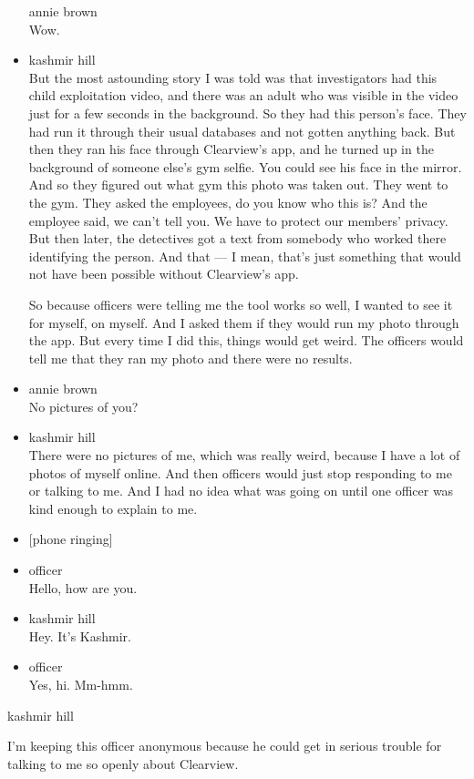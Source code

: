\begin{itemize}
  annie brown\\
  Wow.
\item
  kashmir hill\\
  But the most astounding story I was told was that investigators had
  this child exploitation video, and there was an adult who was visible
  in the video just for a few seconds in the background. So they had
  this person's face. They had run it through their usual databases and
  not gotten anything back. But then they ran his face through
  Clearview's app, and he turned up in the background of someone else's
  gym selfie. You could see his face in the mirror. And so they figured
  out what gym this photo was taken out. They went to the gym. They
  asked the employees, do you know who this is? And the employee said,
  we can't tell you. We have to protect our members' privacy. But then
  later, the detectives got a text from somebody who worked there
  identifying the person. And that --- I mean, that's just something
  that would not have been possible without Clearview's app.

  So because officers were telling me the tool works so well, I wanted
  to see it for myself, on myself. And I asked them if they would run my
  photo through the app. But every time I did this, things would get
  weird. The officers would tell me that they ran my photo and there
  were no results.
\item
  annie brown\\
  No pictures of you?
\item
  kashmir hill\\
  There were no pictures of me, which was really weird, because I have a
  lot of photos of myself online. And then officers would just stop
  responding to me or talking to me. And I had no idea what was going on
  until one officer was kind enough to explain to me.
\item
  {[}phone ringing{]}
\item
  officer\\
  Hello, how are you.
\item
  kashmir hill\\
  Hey. It's Kashmir.
\item
  officer\\
  Yes, hi. Mm-hmm.
\end{itemize}

kashmir hill

I'm keeping this officer anonymous because he could get in serious
trouble for talking to me so openly about Clearview.

